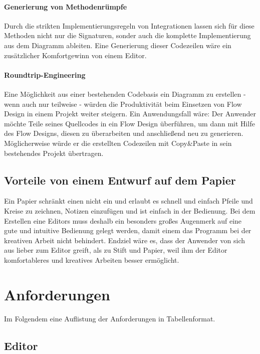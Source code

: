 \subsubsection{Generierung von Methodenrümpfe}

Durch die strikten Implementierungsregeln von Integrationen lassen sich für
diese Methoden nicht nur die Signaturen, sonder auch die komplette Implementierung aus dem Diagramm
ableiten. Eine Generierung dieser Codezeilen wäre ein zusätzlicher Komfortgewinn von einem Editor.
\subsubsection{Roundtrip-Engineering}

Eine Möglichkeit aus einer bestehenden Codebasis ein Diagramm zu erstellen -
wenn auch nur teilweise - würden die Produktivität beim Einsetzen von Flow
Design in einem Projekt weiter steigern.
Ein Anwendungsfall wäre: Der Anwender möchte
Teile seines Quellcodes in ein Flow Design überführen, um dann mit Hilfe des
Flow Designs, diesen zu überarbeiten und anschließend neu zu generieren.
Möglicherweise würde er die erstellten Codezeilen mit Copy\&Paste in sein
bestehendes Projekt übertragen.


\section{Vorteile von einem Entwurf auf dem Papier}

Ein Papier schränkt einen nicht ein und erlaubt es schnell und einfach Pfeile
und Kreise zu zeichnen, Notizen einzufügen und ist einfach in der Bedienung.
Bei dem Erstellen eine Editors muss deshalb ein besonders großes Augenmerk auf
eine gute und intuitive Bedienung gelegt werden, damit einem das Programm bei der kreativen Arbeit nicht
behindert. Endziel wäre es, dass der Anwender von sich aus lieber zum Editor
greift, als zu Stift und Papier, weil ihm der Editor komfortableres und
kreatives Arbeiten besser ermöglicht.

\chapter{Anforderungen}

Im Folgendem eine Auflistung der Anforderungen in Tabellenformat.

\section{Editor}

